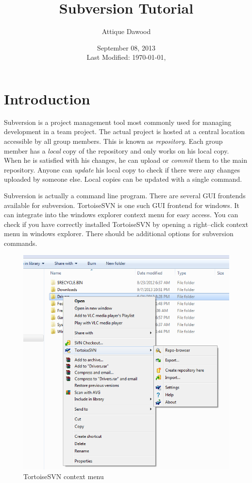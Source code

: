 \documentclass[12pt,a4paper]{article}
\title{\vspace{-2cm}Subversion Tutorial}
\author{Attique Dawood}
\date{September 08, 2013\\[0.2cm] Last Modified: \today, \currenttime}
\begin{document}
\maketitle
\section{Introduction}
Subversion is a project management tool most commonly used for managing development in a team project. The actual project is hosted at a central location accessible by all group members. This is known as \textit{repository}. Each group member has a \textit{local} copy of the repository and only works on his local copy. When he is satisfied with his changes, he can upload or \textit{commit} them to the main repository. Anyone can \textit{update} his local copy to check if there were any changes uploaded by someone else. Local copies can be updated with a single command.

Subversion is actually a command line program. There are several GUI frontends available for subversion. TortoiseSVN is one such GUI frontend for windows. It can integrate into the windows explorer context menu for easy access. You can check if you have correctly installed TortoiseSVN by opening a right--click context menu in windows explorer. There should be additional options for subversion commands.
\begin{figure}[H]
\centering
\includegraphics[scale=0.75]{TortoiseSVNContextMenu.png}
\caption{TortoiseSVN context menu}
\label{TortoiseSVN-context-menu}
\end{figure}
\end{document}
